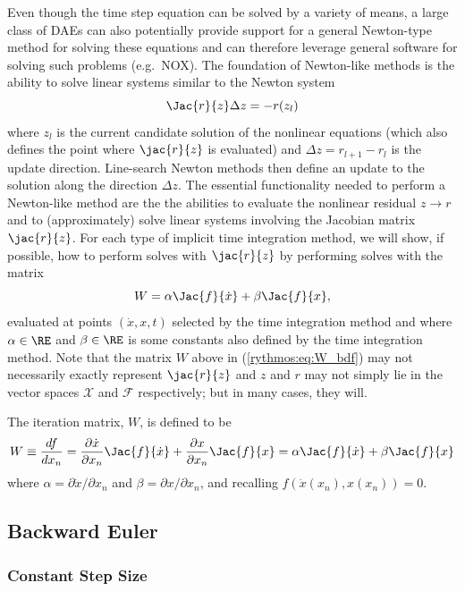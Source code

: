 Even though the time step equation can be solved by a variety of means,
a large class of DAEs can also potentially provide support for a general
Newton-type method for solving these equations and can therefore leverage
general software for solving such problems (e.g.\ NOX). The foundation
of Newton-like methods is the ability to solve linear systems similar
to the Newton system 
\begin{equation}
\Jac{r}{z}\Delta z=-r(z_{l})
\end{equation}
where $z_{l}$ is the current candidate solution of the nonlinear
equations (which also defines the point where $\jac{r}{z}$ is evaluated)
and $\Delta z=r_{l+1}-r_{l}$ is the update direction. Line-search
Newton methods then define an update to the solution along the direction
$\Delta z$. The essential functionality needed to perform a Newton-like
method are the the abilities to evaluate the nonlinear residual $z{}\rightarrow r$
and to (approximately) solve linear systems involving the Jacobian
matrix $\jac{r}{z}$. For each type of implicit time integration method,
we will show, if possible, how to perform solves with $\jac{r}{z}$
by performing solves with the matrix 
\begin{equation}
W=\alpha\Jac{f}{\dot{x}}+\beta\Jac{f}{x},\label{rythmos:eq:W}
\end{equation}
evaluated at points $(\dot{x},x,t)$ selected by the time integration
method and where $\alpha\in\RE$ and $\beta\in\RE$ is some constants
also defined by the time integration method. Note that the matrix
$W$ above in (\ref{rythmos:eq:W_bdf}) may not necessarily exactly
represent $\jac{r}{z}$ and $z$ and $r$ may not simply lie in the
vector spaces $\mathcal{X}$ and $\mathcal{F}$ respectively; but
in many cases, they will.

The iteration matrix, $W$, is defined to be
\[
W\equiv\frac{df}{dx_{n}}=\frac{\partial\dot{x}}{\partial x_{n}}\Jac{f}{\dot{x}}+\frac{\partial x}{\partial x_{n}}\Jac{f}{x}=\alpha\Jac{f}{\dot{x}}+\beta\Jac{f}{x}
\]
where $\alpha=\partial\dot{x}/\partial x_{n}$ and $\beta=\partial x/\partial x_{n}$,
and recalling $f\left(\dot{x}(x_{n}),x(x_{n})\right)=0$.


\subsection{Backward Euler}


\subsubsection{Constant Step Size}


